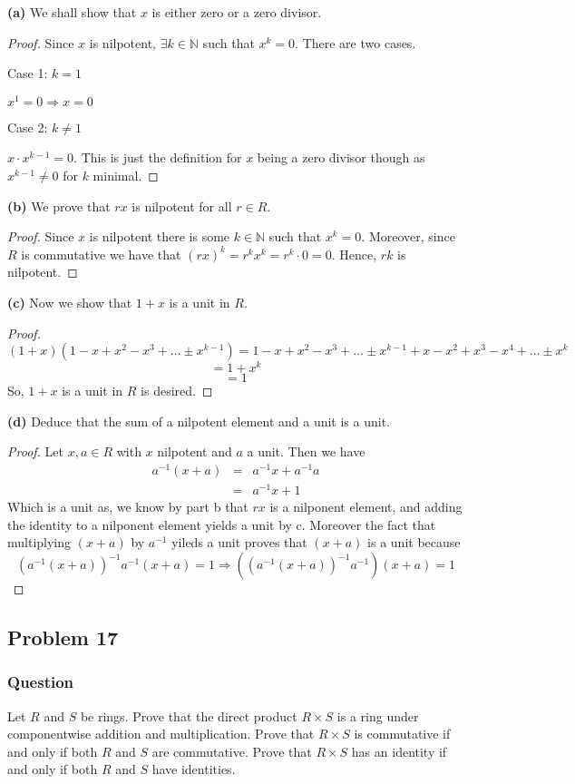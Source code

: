 \documentclass[12pt]{article}
\begin{document}
\textbf{(a)} We shall show that $x$ is either zero or a zero divisor.
\begin{proof}
Since $x$ is nilpotent, $\exists k\in \mathbb{N}$ such that $x^k=0$. There are two cases.

Case 1: $k=1$

$x^1=0 \Rightarrow x=0$

Case 2: $k \neq 1$

$x\cdot x^{k-1}=0$. This is just the definition for $x$ being a zero divisor though as $x^{k-1}\neq 0$ for $k$ minimal.\end{proof}


\textbf{(b)} We prove that $rx$ is nilpotent for all $r \in R$. 
\begin{proof}
Since $x$ is nilpotent there is some $k \in \mathbb{N}$ such that $x^k=0$. Moreover, since $R$ is commutative we have that $(rx)^k=r^k x^k= r^k \cdot 0 = 0$. Hence, $rk$ is nilpotent.
\end{proof}

\textbf{(c)} Now we show that $1+x$ is a unit in $R$.

\begin{proof}
\[(1+x)(1-x+x^2-x^3+\dots\pm x^{k-1})=1-x+x^2-x^3+\dots\pm x^{k-1}+x-x^2+x^3-x^4+\dots\pm x^{k}\]
\[=1+x^k\]
\[=1\]
So, $1+x$ is a unit in $R$ is desired.\end{proof}

\textbf{(d)} Deduce that the sum of a nilpotent element and a unit is a unit.

\begin{proof}
Let $x, a \in R$ with $x$ nilpotent and $a$ a unit. Then we have 
\begin{eqnarray*}
a^{-1}(x+a)&=&a^{-1}x+a^{-1}a\\
&=&a^{-1}x +1
\end{eqnarray*}
Which is a unit as, we know by part b that $rx$ is a nilponent element, and adding the identity to a nilponent element yields a unit by c. Moreover the fact that multiplying $(x+a)$ by $a^{-1}$ yileds a unit proves that $(x+a)$ is a unit because 
\[\left(a^{-1}(x+a)\right)^{-1}a^{-1}(x+a)=1\Rightarrow \left(\left(a^{-1}(x+a)\right)^{-1}a^{-1}\right)(x+a)=1\]
\end{proof}


\subsection{Problem 17}

\subsubsection{Question}
Let $R$ and $S$ be rings. Prove that the direct product $R \times S$ is a ring under componentwise addition and multiplication. Prove that $R \times S$ is commutative if and only if both $R$ and $S$ are commutative. Prove that $R \times S$ has an identity if and only if both $R$ and $S$ have identities. 
\end{document}
